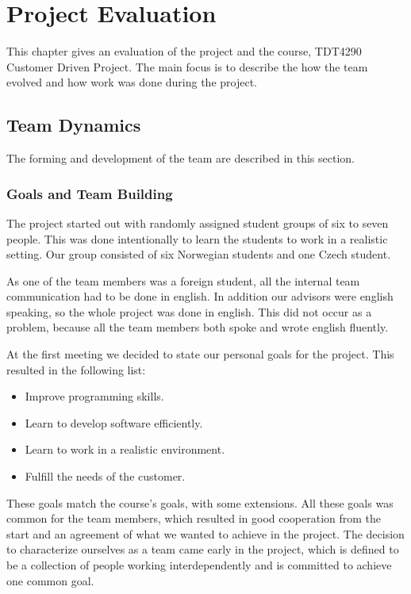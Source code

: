 \chapter{Project Evaluation}
This chapter gives an evaluation of the project and the course, TDT4290 Customer Driven Project. The main focus is to describe the how the team evolved and how work was done during the project.   

\section{Team Dynamics}
The forming and development of the team are described in this section.
\subsection{Goals and Team Building}
The project started out with randomly assigned student groups of six to seven people. This was done intentionally to learn the students to work in a realistic setting. Our group consisted of six Norwegian students and one Czech student. 

As one of the team members was a foreign student, all the internal team communication had to be done in english. In addition our advisors were english speaking, so the whole project was done in english. This did not occur as a problem, because all the team members both spoke and wrote english fluently.

At the first meeting we decided to state our personal goals for the project. This resulted in the following list:
\begin{itemize}
	\item Improve programming skills.
	\item Learn to develop software efficiently.
	\item Learn to work in a realistic environment.
	\item Fulfill the needs of the customer. 
\end{itemize}
These goals match the course's goals, with some extensions. All these goals was common for the team members, which resulted in good cooperation from the start and an agreement of what we wanted to achieve in the project. The decision to characterize ourselves as a team came early in the project, which is defined to be a collection of people working interdependently and is committed to achieve one common goal.


